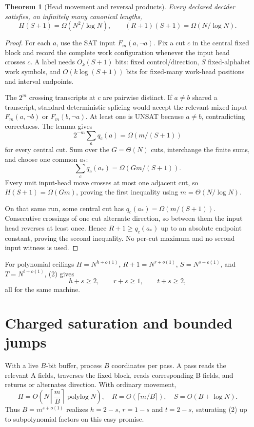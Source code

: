\documentclass[11pt]{article}
\newtheorem{theorem}{Theorem}
\begin{document}
\begin{theorem}[Head movement and reversal products]\label{th:head}
Every declared decider satisfies, on infinitely many canonical lengths,
\[
H(S+1)=\Omega(N^2/\log N),\qquad (R+1)(S+1)=\Omega(N/\log N). \tag{2}
\]
\end{theorem}
\begin{proof}
For each \(a\), use the SAT input \(F_m(a,\neg a)\). Fix a cut \(c\) in the central fixed block and record the complete work configuration whenever the input head crosses \(c\). A label needs \(O_k(S+1)\) bits: fixed control/direction, \(S\) fixed-alphabet work symbols, and \(O(k\log(S+1))\) bits for fixed-many work-head positions and interval endpoints.

The \(2^m\) crossing transcripts at \(c\) are pairwise distinct. If \(a\ne b\) shared a transcript, standard deterministic splicing would accept the relevant mixed input \(F_m(a,\neg b)\) or \(F_m(b,\neg a)\). At least one is UNSAT because \(a\ne b\), contradicting correctness. The lemma gives
\[
2^{-m}\sum_a q_c(a)=\Omega(m/(S+1))
\]
for every central cut. Sum over the \(G=\Theta(N)\) cuts, interchange the finite sums, and choose one common \(a_*\):
\[
\sum_c q_c(a_*)=\Omega(Gm/(S+1)).
\]
Every unit input-head move crosses at most one adjacent cut, so \(H(S+1)=\Omega(Gm)\), proving the first inequality using \(m=\Theta(N/\log N)\).

On that same run, some central cut has \(q_c(a_*)=\Omega(m/(S+1))\). Consecutive crossings of one cut alternate direction, so between them the input head reverses at least once. Hence \(R+1\ge q_c(a_*)\) up to an absolute endpoint constant, proving the second inequality. No per-cut maximum and no second input witness is used.
\end{proof}

For polynomial ceilings \(H=N^{h+o(1)}\), \(R+1=N^{r+o(1)}\), \(S=N^{s+o(1)}\), and \(T=N^{t+o(1)}\), (2) gives
\[
h+s\ge2,\qquad r+s\ge1,\qquad t+s\ge2,
\]
all for the same machine.

\section{Charged saturation and bounded jumps}
With a live \(B\)-bit buffer, process \(B\) coordinates per pass. A pass reads the relevant A fields, traverses the fixed block, reads corresponding B fields, and returns or alternates direction. With ordinary movement,
\[
H=O\left(N\left\lceil\frac mB\right\rceil\operatorname{polylog}N\right),\quad
R=O(\lceil m/B\rceil),\quad S=O(B+\log N).
\]
Thus \(B=m^{s+o(1)}\) realizes \(h=2-s\), \(r=1-s\) and \(t=2-s\), saturating (2) up to subpolynomial factors on this easy promise.
\end{document}
